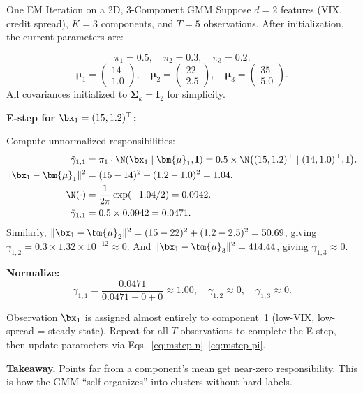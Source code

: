 \begin{workedexample}{One EM Iteration on a 2D, 3-Component GMM}
Suppose $d = 2$ features (VIX, credit spread), $K = 3$ components, and
$T = 5$ observations.  After initialization, the current parameters are:

\[
  \pi_1 = 0.5, \quad \pi_2 = 0.3, \quad \pi_3 = 0.2.
\]
\[
  \bm{\mu}_1 = \begin{pmatrix} 14 \\ 1.0 \end{pmatrix}, \quad
  \bm{\mu}_2 = \begin{pmatrix} 22 \\ 2.5 \end{pmatrix}, \quad
  \bm{\mu}_3 = \begin{pmatrix} 35 \\ 5.0 \end{pmatrix}.
\]
All covariances initialized to $\bm{\Sigma}_k = \mathbf{I}_2$ for
simplicity.

\textbf{E-step for $\bx_1 = (15, 1.2)^\top$:}

Compute unnormalized responsibilities:
\begin{align*}
  \tilde{\gamma}_{1,1} &= \pi_1 \cdot \N(\bx_1 \mid \bm{\mu}_1,
    \mathbf{I}) = 0.5 \times \N\bigl((15,1.2)^\top \mid (14,1.0)^\top,
    \mathbf{I}\bigr). \\
  \|\bx_1 - \bm{\mu}_1\|^2 &= (15-14)^2 + (1.2-1.0)^2 = 1.04. \\
  \N(\cdot) &= \frac{1}{2\pi} \exp(-1.04/2) = 0.0942. \\
  \tilde{\gamma}_{1,1} &= 0.5 \times 0.0942 = 0.0471.
\end{align*}
Similarly, $\|\bx_1 - \bm{\mu}_2\|^2 = (15-22)^2 + (1.2-2.5)^2 = 50.69$,
giving $\tilde{\gamma}_{1,2} = 0.3 \times 1.32 \times 10^{-12} \approx 0$.
And $\|\bx_1 - \bm{\mu}_3\|^2 = 414.44$, giving
$\tilde{\gamma}_{1,3} \approx 0$.

\textbf{Normalize:}
\[
  \gamma_{1,1} = \frac{0.0471}{0.0471 + 0 + 0} \approx 1.00, \quad
  \gamma_{1,2} \approx 0, \quad \gamma_{1,3} \approx 0.
\]

Observation $\bx_1$ is assigned almost entirely to component~1 (low-VIX,
low-spread = steady state).  Repeat for all $T$ observations to complete
the E-step, then update parameters via Eqs.~\eqref{eq:mstep-n}--\eqref{eq:mstep-pi}.

\textbf{Takeaway.}  Points far from a component's mean get
near-zero responsibility.  This is how the GMM ``self-organizes'' into
clusters without hard labels.
\end{workedexample}

